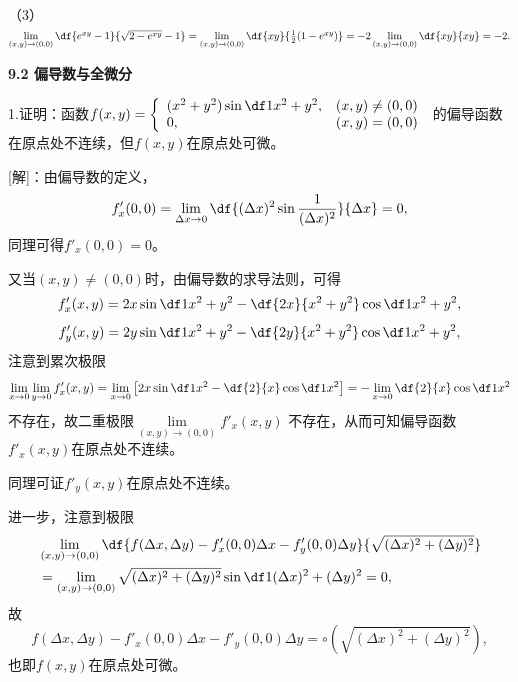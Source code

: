（3）
$\lim\limits_{(x,y)\to(0,0)}\df{e^{xy}-1}{\sqrt{2-e^{xy}}-1}
=\lim\limits_{(x,y)\to(0,0)}\df{xy}{\frac12(1-e^{xy})}
=-2\lim\limits_{(x,y)\to(0,0)}\df{xy}{xy}=-2.$
\fin

\bs

\begin{center}
	\bf 9.2 偏导数与全微分
\end{center}

1.证明：函数$f(x,y)=\left\{\begin{array}{ll}
  	(x^2+y^2)\sin\df1{x^2+y^2}, & (x,y)\ne(0,0)\\
  	0, & (x,y)=(0,0)
  \end{array}\right.$
  的偏导函数在原点处不连续，但$f(x,y)$在原点处可微。

[解]：由偏导数的定义，
$$f'_x(0,0)=\lim\limits_{\Delta x\to 0}
\df{(\Delta x)^2\sin\frac1{(\Delta x)^2}}{\Delta x}=0,$$
同理可得$f'_x(0,0)=0$。

又当$(x,y)\ne(0,0)$时，由偏导数的求导法则，可得
$$f'_x(x,y)=2x\sin\df1{x^2+y^2}-\df{2x}{x^2+y^2}\cos\df1{x^2+y^2},$$
$$f'_y(x,y)=2y\sin\df1{x^2+y^2}-\df{2y}{x^2+y^2}\cos\df1{x^2+y^2},$$
注意到累次极限
$$\lim\limits_{x\to 0}\lim\limits_{y\to 0}
f'_x(x,y)
=\lim\limits_{x\to 0}
\left[2x\sin\df1{x^2}-\df{2}{x}\cos\df1{x^2}\right]
=-\lim\limits_{x\to 0}
\df{2}{x}\cos\df1{x^2}$$
不存在，故二重极限$\lim\limits_{(x,y)\to(0,0)}f'_x(x,y)$
不存在，从而可知偏导函数$f'_x(x,y)$在原点处不连续。

同理可证$f'_y(x,y)$在原点处不连续。

进一步，注意到极限
\begin{align*}
	&\lim\limits_{(x,y)\to(0,0)}\df{f(\Delta x,\Delta y)-f'_x(0,0)\Delta x
	-f'_y(0,0)\Delta y}{\sqrt{(\Delta x)^2+(\Delta y)^2}}\\
	&=\lim\limits_{(x,y)\to(0,0)}\sqrt{(\Delta x)^2+(\Delta y)^2}
	\sin\df1{(\Delta x)^2+(\Delta y)^2}=0,
\end{align*}
故
$$f(\Delta x,\Delta y)-f'_x(0,0)\Delta x-f'_y(0,0)\Delta y
=\circ(\sqrt{(\Delta x)^2+(\Delta y)^2}),$$
也即$f(x,y)$在原点处可微。\fin

\bs

% 

